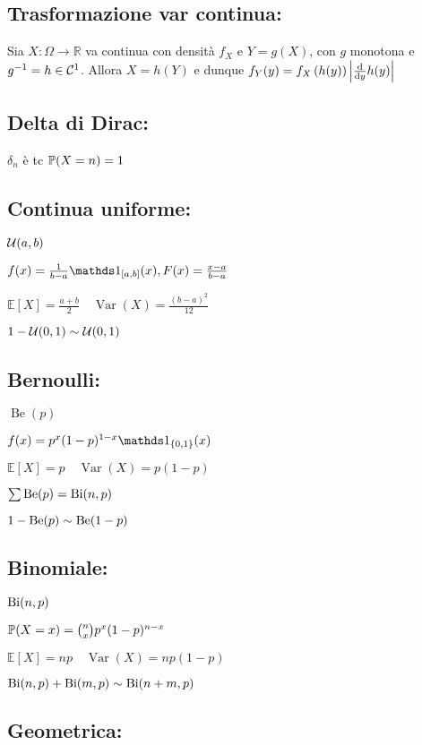 
\subsection{Trasformazione var continua:}

Sia $X:\Omega \rightarrow \mathbb{R}$ va continua con densità $f_{X}$ e $Y=g(X)$, con $g$ monotona e $g^{-1}=h \in \mathcal{C}^{1}$. Allora $X=h(Y)$ e dunque $f_{Y}(y)=f_{X}\left(h(y)\right)\left|\frac{\mathrm{d}}{\mathrm{d} y} h(y)\right|$

\subsection{Delta di Dirac:}

$\delta_{n}$ è tc $\mathbb{P}(X=n)=1$

\subsection{Continua uniforme:} 

$\mathcal{U}(a, b)$

$f(x)=\frac{1}{b-a} \Ind_{[a,b]}(x), F(x)=\frac{x-a}{b-a}$

$\mathbb{E}[X]=\frac{a+b}{2}\quad \operatorname{Var}(X)=\frac{(b-a)^{2}}{12}$

$1-\mathcal{U}(0,1)\sim\mathcal{U}(0,1)$

\subsection{Bernoulli:} 

$\operatorname{Be}(p)$

$f(x)=p^x(1-p)^{1-x}\Ind_{\{0,1\}}(x)$

$\mathbb{E}[X]=p\quad \operatorname{Var}(X)=p(1-p)$

$\sum \operatorname{Be}(p)=\operatorname{Bi}(n,p)$

$1-\operatorname{Be}(p)\sim\operatorname{Be}(1-p)$

\subsection{Binomiale:} 

$\operatorname{Bi}(n, p)$

$\mathbb{P}(X=x)=\binom{n}{x}p^x(1-p)^{n-x}$

$\mathbb{E}[X]=n p\quad \operatorname{Var}(X)=n p(1-p)$

$\operatorname{Bi}(n,p)+\operatorname{Bi}(m,p)\sim\operatorname{Bi}(n+m,p)$

\subsection{Geometrica:} 

